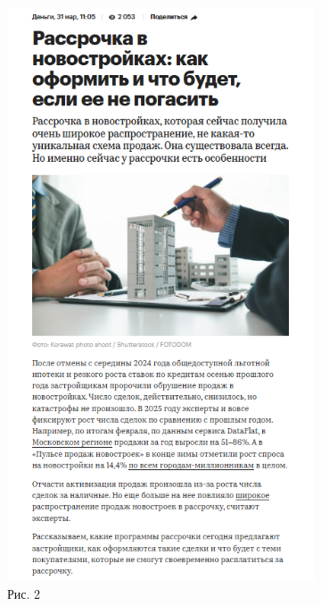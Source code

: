 \documentclass{scrreprt}
\begin{document}
 \begin{figure}[ht]
 	\centering
 	\hfill
 	\begin{subfigure}[b]{0.4\textwidth}
 		\includegraphics[width=\textwidth]{b}
 		\caption{Рис. 2}
 	\end{subfigure}
 	\hfill
 	\begin{subfigure}[b]{0.4\textwidth}

\end{subfigure}
\end{figure}
\end{document}
